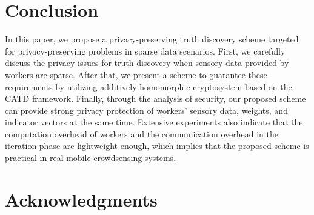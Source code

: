 \documentclass[conference]{IEEEtran}
\begin{document}
\section{Conclusion}\label{sec8}
In this paper, we propose a privacy-preserving truth discovery scheme targeted for privacy-preserving problems in sparse data scenarios.
First, we carefully discuss the privacy issues for truth discovery when sensory data provided by workers are sparse.
After that, we present a scheme to guarantee these requirements by utilizing additively homomorphic cryptosystem based on the CATD framework.
Finally, through the analysis of security, our proposed scheme can provide strong privacy protection of workers' sensory data, weights, and indicator vectors at the same time.
Extensive experiments also indicate that the computation overhead of workers and the communication overhead in the iteration phase are lightweight enough, which implies that the proposed scheme is practical in real mobile crowdsensing systems.

\section*{Acknowledgments}




\vspace{12pt}
\end{document}
